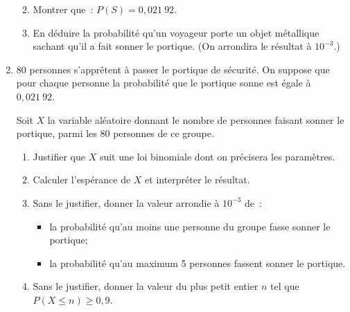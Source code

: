 \begin{enumerate}
\begin{enumerate}[label=\alph*.]
\begin{center}
\begin{extern}
               \end{extern}
          \end{center}
          \item Montrer que~: $P(S)=0,021~92$.
          \item En déduire la probabilité qu'un voyageur porte un objet métallique sachant qu'il a fait sonner le portique. (On arrondira le résultat à $10^{-3}$.)
     \end{enumerate}
     \item 80 personnes s'apprêtent à passer le portique de sécurité. On suppose que pour chaque personne la probabilité que le portique sonne est égale à $0,021~92$.
     \par
     Soit $X$ la variable aléatoire donnant le nombre de personnes faisant sonner le portique, parmi les 80 personnes de ce groupe.
     \begin{enumerate}[label=\alph*.]
          \item Justifier que $X$ suit une loi binomiale dont on précisera les paramètres.
          \item Calculer l'espérance de $X$ et interpréter le résultat.
          \item
          Sans le justifier, donner la valeur arrondie à $10^{-3}$ de~:
          \begin{itemize}
               \item la probabilité qu'au moins une personne du groupe fasse sonner le portique;
               \item la probabilité qu'au maximum 5 personnes fassent sonner le portique.
          \end{itemize}
          \item Sans le justifier, donner la valeur du plus petit entier $n$ tel que $P(X \leqslant n) \geqslant 0,9$.
     \end{enumerate}
\end{enumerate}
